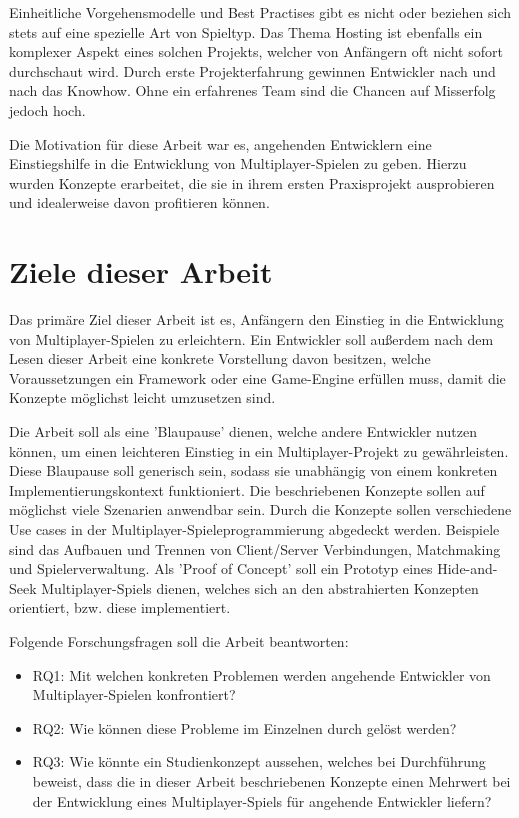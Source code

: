 Einheitliche Vorgehensmodelle und Best Practises gibt es nicht oder beziehen sich stets auf eine spezielle Art von Spieltyp. Das Thema Hosting ist ebenfalls ein komplexer Aspekt eines solchen Projekts, welcher von Anfängern oft nicht sofort durchschaut wird. Durch erste Projekterfahrung gewinnen Entwickler nach und nach das Knowhow. Ohne ein erfahrenes Team sind die Chancen auf Misserfolg jedoch hoch. \cite{Payne.18.09.2019}

Die Motivation für diese Arbeit war es, angehenden Entwicklern eine Einstiegshilfe in die Entwicklung von Multiplayer-Spielen zu geben. Hierzu wurden Konzepte erarbeitet, die sie in ihrem ersten Praxisprojekt ausprobieren und idealerweise davon profitieren können.

\section{Ziele dieser Arbeit}

Das primäre Ziel dieser Arbeit ist es, Anfängern den Einstieg in die Entwicklung von Multiplayer-Spielen zu erleichtern. Ein Entwickler soll außerdem nach dem Lesen dieser Arbeit eine konkrete Vorstellung davon besitzen, welche Voraussetzungen ein Framework oder eine Game-Engine erfüllen muss, damit die Konzepte möglichst leicht umzusetzen sind.

Die Arbeit soll als eine 'Blaupause' dienen, welche andere Entwickler nutzen können, um einen leichteren Einstieg in ein Multiplayer-Projekt zu gewährleisten. Diese Blaupause soll generisch sein, sodass sie unabhängig von einem konkreten Implementierungskontext funktioniert. Die beschriebenen Konzepte sollen auf möglichst viele Szenarien anwendbar sein. Durch die Konzepte sollen verschiedene Use cases in der Multiplayer-Spieleprogrammierung abgedeckt werden. Beispiele sind das Aufbauen und Trennen von Client/Server Verbindungen, Matchmaking \cite{Wikipedia.2021b} und Spielerverwaltung. Als 'Proof of Concept' soll ein Prototyp eines Hide-and-Seek Multiplayer-Spiels dienen, welches sich an den abstrahierten Konzepten orientiert, bzw. diese implementiert. 

Folgende Forschungsfragen soll die Arbeit beantworten:

\begin{itemize}
	\item \label{RQ1} RQ1: Mit welchen konkreten Problemen werden angehende Entwickler von Multiplayer-Spielen konfrontiert?
	\item \label{RQ2} RQ2: Wie können diese Probleme im Einzelnen durch gelöst werden?
	\item \label{RQ3} RQ3: Wie könnte ein Studienkonzept aussehen, welches bei Durchführung beweist, dass die in dieser Arbeit beschriebenen Konzepte einen Mehrwert bei der Entwicklung eines Multiplayer-Spiels für angehende Entwickler liefern?
\end{itemize}

